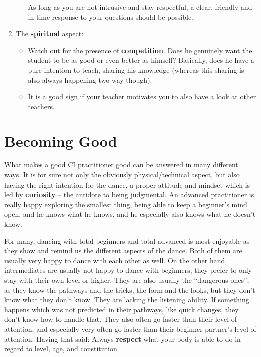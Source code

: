 \begin{enumerate}
\begin{itemize}
        As long as you are not intrusive and stay respectful, a clear, friendly and in-time response to your questions should be possible.
    \end{itemize}
    \item The \textbf{spiritual} aspect:
    \begin{itemize}
        \item Watch out for the presence of \textbf{competition}.
        Does he genuinely want the student to be as good or even better as himself?
        Basically, does he have a pure intention to teach, sharing his knowledge (whereas this sharing is also always happening two-way though).
        \item It is a good sign if your teacher motivates you to also have a look at other teachers.
    \end{itemize}
\end{enumerate}

\section{Becoming Good}\label{sec:becoming-good}

What makes a good CI practitioner good can be answered in many different ways.
It is for sure not only the obviously physical/technical aspect, but also having the right intention for the dance, a proper attitude and mindset which is led by \textbf{curiosity} -- the antidote to being judgmental.
An advanced practitioner is really happy exploring the smallest thing, being able to keep a beginner's mind open, and he knows what he knows, and he especially also knows what he doesn't know.

For many, dancing with total beginners and total advanced is most enjoyable as they show and remind us the different aspects of the dance.
Both of them are usually very happy to dance with each other as well.
On the other hand, intermediates are usually not happy to dance with beginners; they prefer to only stay with their own level or higher.
They are also usually the ``dangerous ones'', as they know the pathways and the tricks, the form and the looks, but they don't know what they don't know.
They are lacking the listening ability.
If something happens which was not predicted in their pathways, like quick changes, they don't know how to handle that.
They also often go faster than their level of attention, and especially very often go faster than their beginner-partner's level of attention.
Having that said: Always \textbf{respect} what your body is able to do in regard to level, age, and constitution.

